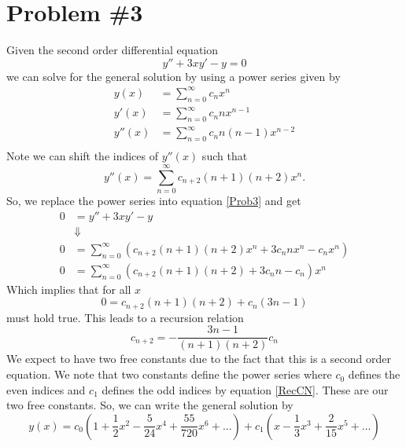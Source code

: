 \documentclass[11pt]{article}
\numberwithin{equation}{section}
\begin{document}
\section{Problem \#3}
Given the second order differential equation
\begin{equation}
y''+3xy'-y=0
\label{Prob3}
\end{equation}
we can solve for the general solution by using a power series given by
\begin{align*}
y(x) &= \sum_{n=0}^{\infty}c_nx^n\\
y'(x) &= \sum_{n=0}^{\infty}c_nnx^{n-1}\\
y''(x) &= \sum_{n=0}^{\infty}c_nn(n-1)x^{n-2}\\
\end{align*}
Note we can shift the indices of $y''(x)$ such that
$$y''(x) = \sum_{n=0}^{\infty}c_{n+2}(n+1)(n+2)x^{n}.$$
So, we replace the power series into equation \ref{Prob3} and get
\begin{align*}
0 &= y''+3xy'-y\\
&\Downarrow\\
0 &= \sum_{n=0}^{\infty}\left(c_{n+2}(n+1)(n+2)x^{n} + 3c_nnx^{n}-c_nx^n\right)\\
0 &= \sum_{n=0}^{\infty}\left(c_{n+2}(n+1)(n+2) + 3c_nn-c_n\right)x^n
\end{align*}
Which implies that for all $x$ 
$$0 = c_{n+2}(n+1)(n+2) + c_n(3n-1)$$
must hold true. This leads to a recursion relation
\begin{equation}
c_{n+2} = -\frac{3n-1}{(n+1)(n+2)}c_n
\label{RecCN}
\end{equation}
We expect to have two free constants due to the fact that this is a second order equation.
We note that two constants define the power series where $c_0$ defines the even indices and
$c_1$ defines the odd indices by equation \ref{RecCN}. These are our two free constants. 
So, we can write the general solution by
$$y(x) = c_0\left(1 + \frac{1}{2}x^2 - \frac{5}{24}x^4 + \frac{55}{720}x^6+...\right)
         +c_1\left(x - \frac{1}{3}x^3 + \frac{2}{15}x^5 + ...\right)$$


\pagebreak
\end{document}

